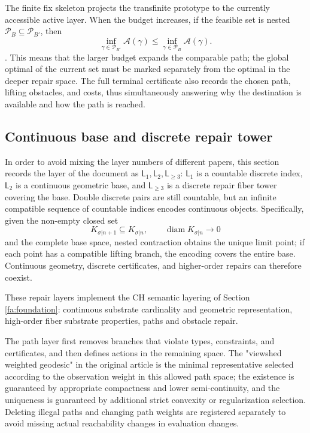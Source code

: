 \documentclass[11pt,a4paper]{article}
\theoremstyle{plain}
\theoremstyle{definition}
\theoremstyle{remark}
\begin{document}
\begin{CJK*}
The finite fix skeleton projects the transfinite prototype to the currently accessible active layer. When the budget increases, if the feasible set is nested $\mathcal P_B\subseteq\mathcal P_{B'}$, then \[
 \inf_{\gamma\in\mathcal P_{B'}}\mathcal A(\gamma)
 \le\inf_{\gamma\in\mathcal P_B}\mathcal A(\gamma).
\]. This means that the larger budget expands the comparable path; the global optimal of the current set must be marked separately from the optimal in the deeper repair space. The full terminal certificate also records the chosen path, lifting obstacles, and costs, thus simultaneously answering why the destination is available and how the path is reached.

\subsection { Continuous base and discrete repair tower }

In order to avoid mixing the layer numbers of different papers, this section records the layer of the document \cite{S26} as $\mathsf L_1,\mathsf L_2,\mathsf L_{\ge3}$: $\mathsf L_1$ is a countable discrete index, $\mathsf L_2$ is a continuous geometric base, and $\mathsf L_{\ge3}$ is a discrete repair fiber tower covering the base. Double discrete pairs are still countable, but an infinite compatible sequence of countable indices encodes continuous objects. Specifically, given the non-empty closed set \[
 K_{\sigma|n+1}\subseteq K_{\sigma|n},
 \qquad \operatorname{diam}K_{\sigma|n}\longrightarrow0
\] and the complete base space, nested contraction obtains the unique limit point; if each point has a compatible lifting branch, the encoding covers the entire base. Continuous geometry, discrete certificates, and higher-order repairs can therefore coexist.

These repair layers implement the CH semantic layering of Section ~ \ref{fa:foundation}: continuous substrate cardinality and geometric representation, high-order fiber substrate properties, paths and obstacle repair.

The path layer first removes branches that violate types, constraints, and certificates, and then defines actions in the remaining space. The "viewshed weighted geodesic" in the original article is the minimal representative selected according to the observation weight in this allowed path space; the existence is guaranteed by appropriate compactness and lower semi-continuity, and the uniqueness is guaranteed by additional strict convexity or regularization selection. Deleting illegal paths and changing path weights are registered separately to avoid missing actual reachability changes in evaluation changes.


\end{CJK*}
\end{document}
